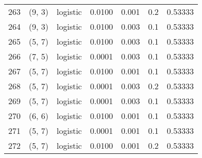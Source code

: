 \begin{tabular}{lllrrrr}
263 &      (9, 3) &  logistic &  0.0100 &  0.001 &  0.2 &   0.53333 \\
264 &      (9, 3) &  logistic &  0.0100 &  0.003 &  0.1 &   0.53333 \\
265 &      (5, 7) &  logistic &  0.0100 &  0.003 &  0.1 &   0.53333 \\
266 &      (7, 5) &  logistic &  0.0001 &  0.003 &  0.1 &   0.53333 \\
267 &      (5, 7) &  logistic &  0.0100 &  0.001 &  0.1 &   0.53333 \\
268 &      (5, 7) &  logistic &  0.0001 &  0.003 &  0.2 &   0.53333 \\
269 &      (5, 7) &  logistic &  0.0001 &  0.003 &  0.1 &   0.53333 \\
270 &      (6, 6) &  logistic &  0.0100 &  0.001 &  0.1 &   0.53333 \\
271 &      (5, 7) &  logistic &  0.0001 &  0.001 &  0.1 &   0.53333 \\
272 &      (5, 7) &  logistic &  0.0100 &  0.001 &  0.2 &   0.53333 \\
\bottomrule
\end{tabular}
